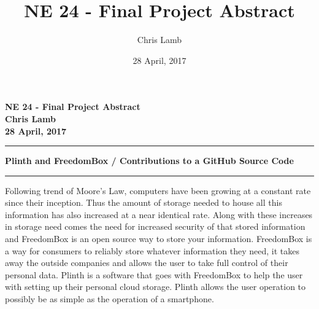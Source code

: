 \documentclass[12pt]{article}
\author{Chris Lamb}
\title{NE 24 - Final Project Abstract}
\date{28 April, 2017}
\begin{document}
\begin{center}
\textbf{NE 24 - Final Project Abstract \\ Chris Lamb \\ 28 April, 2017}
\end{center}
\noindent\rule{17cm}{1pt}

\begin{center}
\textbf{Plinth and FreedomBox / Contributions to a GitHub Source Code}
\rule{14cm}{0.4pt}
\end{center}

Following trend of Moore's Law, computers have been growing at a constant rate since their inception. Thus the amount of storage needed to house all this information has also increased at a near identical rate. Along with these increases in storage need comes the need for increased security of that stored information and FreedomBox is an open source way to store your information. FreedomBox is a way for consumers to reliably store whatever information they need, it takes away the outside companies and allows the user to take full control of their personal data. Plinth is a software that goes with FreedomBox to help the user with setting up their personal cloud storage. Plinth allows the user operation to possibly be as simple as the operation of a smartphone. 
\end{document}
